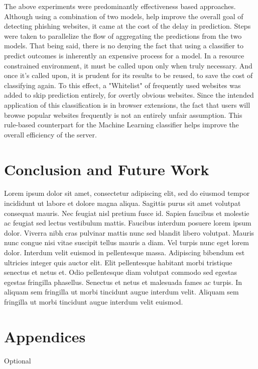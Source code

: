 \documentclass[conference]{IEEEtran}
\begin{document}
\par The above experiments were predominantly effectiveness based approaches. Although using a combination of two models, help improve the overall goal of detecting phishing websites, it came at the cost of the delay in prediction. Steps were taken to parallelize the flow of aggregating the predictions from the two models. That being said, there is no denying the fact that using a classifier to predict outcomes is inherently an expensive process for a model. In a resource constrained environment, it must be called upon only when truly necessary. And once it's called upon, it is prudent for its results to be reused, to save the cost of classifying again. To this effect, a "Whitelist" of frequently used websites was added to skip prediction entirely, for overtly obvious websites. Since the intended application of this classification is in browser extensions,  the fact that users will browse popular websites frequently is not an entirely unfair assumption. This rule-based counterpart for the Machine Learning classifier helps improve the overall efficiency of the server.

\section{Conclusion and Future Work}
Lorem ipsum dolor sit amet, consectetur adipiscing elit, sed do eiusmod tempor incididunt ut labore et dolore magna aliqua. Sagittis purus sit amet volutpat consequat mauris. Nec feugiat nisl pretium fusce id. Sapien faucibus et molestie ac feugiat sed lectus vestibulum mattis. Faucibus interdum posuere lorem ipsum dolor. Viverra nibh cras pulvinar mattis nunc sed blandit libero volutpat. Mauris nunc congue nisi vitae suscipit tellus mauris a diam. Vel turpis nunc eget lorem dolor. Interdum velit euismod in pellentesque massa. Adipiscing bibendum est ultricies integer quis auctor elit. Elit pellentesque habitant morbi tristique senectus et netus et. Odio pellentesque diam volutpat commodo sed egestas egestas fringilla phasellus. Senectus et netus et malesuada fames ac turpis. In aliquam sem fringilla ut morbi tincidunt augue interdum velit. Aliquam sem fringilla ut morbi tincidunt augue interdum velit euismod.

\section{Appendices}
Optional
\end{document}
